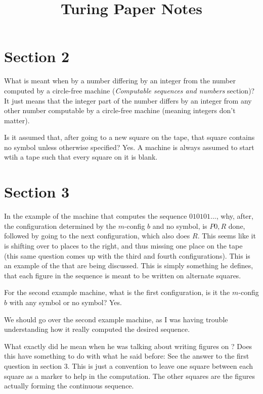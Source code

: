 \documentclass{article}
\title{Turing Paper Notes}
\theoremstyle{definition}
\newcommand{\?}{\stackrel{?}{=}}
\begin{document}
\maketitle

\section*{Section 2}
What is meant when by a number differing by an integer from the number computed by a circle-free machine (\textit{Computable sequences and numbers} section)? It 
just means that the integer part of the number differs by an integer from any other number computable by a circle-free machine (meaning integers don't matter).

Is it assumed that, after going to a new square on the tape, that square contains no symbol unless otherwise specified? Yes. A machine is always assumed to start 
wtih a tape such that every square on it is blank.

\section*{Section 3}

In the example of the machine that computes the sequence $010101...$, why, after, the configuration determined by the $m$-config $b$ and no symbol, is 
$P0,R$ done, followed by going to the next configuration, which also does $R$. This seems like it is shifting over to places to the right, 
and thus missing one place on the tape (this same question comes up with the third and fourth configurations). This is an example of the  that 
are being discussed. This is simply something he defines, that each figure in the sequence is meant to be written on alternate squares.

For the second example machine, what is the first configuration, is it the $m$-config $b$ with any symbol or no symbol? Yes.

We should go over the second example machine, as I was having trouble understanding how it really computed the desired sequence.

\e
What exactly did he mean when he was talking about writing figures on ? 
Does this have something to do with what he said before:  See the answer to the first question in section 3. This is just a convention to leave one square 
between each square as a marker to help in the computation. The other squares are the figures actually forming the continuous sequence.
\end{document}
